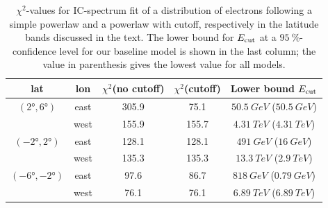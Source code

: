 \begin{table}
  \begin{center}
    \caption{$\chi^2$-values for IC-spectrum fit of a distribution of electrons following a simple powerlaw and a powerlaw with cutoff, respectively in the latitude bands discussed in the text. The lower bound for $E_{\text{cut}}$ at a $\SI{95}{\percent}$-confidence level for our baseline model is shown in the last column; the value in parenthesis gives the lowest value for all models.}
    \label{tab:IC}
    \begin{tabular}{|c|c|c|c|c|} %
     	\hline
		 lat & lon  & $\chi^2$(no cutoff) &  $\chi^2$(cutoff) & Lower bound $E_{\text{cut}}$ \\ 
		\hline
  		$(\ang{2}, \ang{6})$ & east & 305.9 & 75.1  & $\SI{50.5}{GeV}$ ($\SI{50.5}{GeV}$)\\ 
		& west & 155.9 & 155.7  & $\SI{4.31}{TeV}$ ($\SI{4.31}{TeV}$) \\ 
 		\hline
  		$(\ang{-2}, \ang{2})$ & east & 128.1 & 128.1 & $\SI{491}{GeV}$ ($\SI{16}{GeV}$)\\ 
		& west & 135.3 & 135.3 & $\SI{13.3}{TeV}$ ($\SI{2.9}{TeV}$)\\ 
 		\hline
  		$(\ang{-6}, \ang{-2})$ & east & 97.6 & 86.7 & $\SI{818}{GeV}$ ($\SI{0.79}{GeV}$)\\ 
		& west & 76.1 & 76.1 & $\SI{6.89}{TeV}$ ($\SI{6.89}{TeV}$) \\ 
 \hline
    \end{tabular}
  \end{center}
\end{table}






